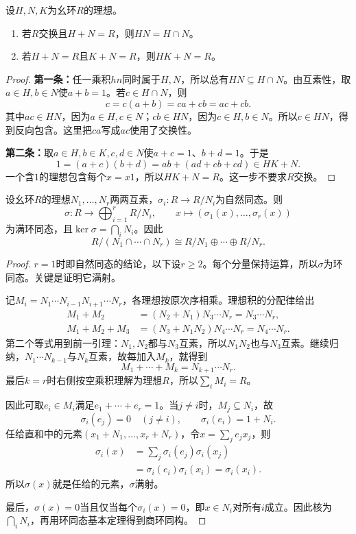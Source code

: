 \begin{lemma}\label{p2:ring-comaximal-product}
设$H,N,K$为幺环$R$的理想。
\begin{enumerate}
\item 若$R$交换且$H+N=R$，则$HN=H\cap N$。
\item 若$H+N=R$且$K+N=R$，则$HK+N=R$。
\end{enumerate}
\end{lemma}
\begin{proof}
\textbf{第一条：}任一乘积$hn$同时属于$H,N$，所以总有$HN\subseteq H\cap N$。由互素性，取$a\in H,b\in N$使$a+b=1$。若$c\in H\cap N$，则
\[
c=c(a+b)=ca+cb=ac+cb.
\]
其中$ac\in HN$，因为$a\in H,c\in N$；$cb\in HN$，因为$c\in H,b\in N$。所以$c\in HN$，得到反向包含。这里把$ca$写成$ac$使用了交换性。

\textbf{第二条：}取$a\in H,b\in K,c,d\in N$使$a+c=1$、$b+d=1$。于是
\[
1=(a+c)(b+d)=ab+(ad+cb+cd)\in HK+N.
\]
一个含$1$的理想包含每个$x=x1$，所以$HK+N=R$。这一步不要求$R$交换。
\end{proof}

\begin{theorem}\label{p2:ring-crt}
设幺环$R$的理想$N_1,\ldots,N_r$两两互素，$\sigma_i:R\to R/N_i$为自然同态。则
\[
\sigma:R\longrightarrow\bigoplus_{i=1}^rR/N_i,
\qquad x\longmapsto(\sigma_1(x),\ldots,\sigma_r(x))
\]
为满环同态，且$\ker\sigma=\bigcap_iN_i$。因此
\[
R/(N_1\cap\cdots\cap N_r)\cong R/N_1\oplus\cdots\oplus R/N_r.
\]
\end{theorem}
\begin{proof}
$r=1$时即自然同态的结论，以下设$r\geq2$。每个分量保持运算，所以$\sigma$为环同态。关键是证明它满射。

记$M_i=N_1\cdots N_{i-1}N_{i+1}\cdots N_r$，各理想按原次序相乘。理想积的分配律给出
\begin{align*}
M_1+M_2&=(N_2+N_1)N_3\cdots N_r=N_3\cdots N_r,\\
M_1+M_2+M_3&=(N_3+N_1N_2)N_4\cdots N_r=N_4\cdots N_r.
\end{align*}
第二个等式用到前一引理：$N_1,N_2$都与$N_3$互素，所以$N_1N_2$也与$N_3$互素。继续归纳，$N_1\cdots N_{k-1}$与$N_k$互素，故每加入$M_k$，就得到
\[
M_1+\cdots+M_k=N_{k+1}\cdots N_r.
\]
最后$k=r$时右侧按空乘积理解为理想$R$，所以$\sum_iM_i=R$。

因此可取$e_i\in M_i$满足$e_1+\cdots+e_r=1$。当$j\ne i$时，$M_j\subseteq N_i$，故
\[
\sigma_i(e_j)=0\quad(j\ne i),\qquad\sigma_i(e_i)=1+N_i.
\]
任给直和中的元素$(x_1+N_1,\ldots,x_r+N_r)$，令$x=\sum_j e_jx_j$，则
\begin{align*}
\sigma_i(x)&=\sum_j\sigma_i(e_j)\sigma_i(x_j)\\
&=\sigma_i(e_i)\sigma_i(x_i)=\sigma_i(x_i).
\end{align*}
所以$\sigma(x)$就是任给的元素，$\sigma$满射。

最后，$\sigma(x)=0$当且仅当每个$\sigma_i(x)=0$，即$x\in N_i$对所有$i$成立。因此核为$\bigcap_iN_i$，再用环同态基本定理得到商环同构。
\end{proof}

